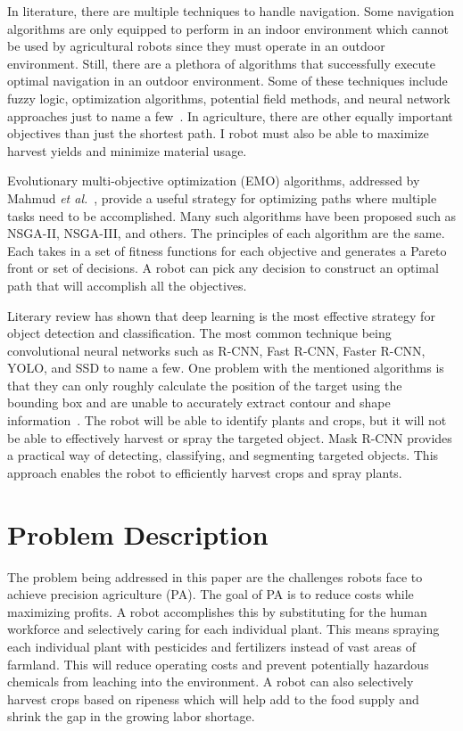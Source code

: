\documentclass[12pt]{article}
\begin{document}
In literature, there are multiple techniques to handle navigation. Some navigation algorithms are only equipped to perform in an indoor environment which cannot be used by agricultural robots since they must operate in an outdoor environment. Still, there are a plethora of algorithms that successfully execute optimal navigation in an outdoor environment. Some of these techniques include fuzzy logic, optimization algorithms, potential field methods, and neural network approaches just to name a few~\cite{mohanta2019knowledge}. In agriculture, there are other equally important objectives than just the shortest path. I robot must also be able to maximize harvest yields and minimize material usage.

Evolutionary multi-objective optimization (EMO) algorithms, addressed by Mahmud \emph{et al.}~\cite{MAHMUD2019488}, provide a useful strategy for optimizing paths where multiple tasks need to be accomplished. Many such algorithms have been proposed such as NSGA-II, NSGA-III, and others. The principles of each algorithm are the same. Each takes in a set of fitness functions for each objective and generates a Pareto front or set of decisions. A robot can pick any decision to construct an optimal path that will accomplish all the objectives.

Literary review has shown that deep learning is the most effective strategy for object detection and classification. The most common technique being convolutional neural networks such as R-CNN, Fast R-CNN, Faster R-CNN, YOLO, and SSD to name a few. One problem with the mentioned algorithms is that they can only roughly calculate the position of the target using the bounding box and are unable to accurately extract contour and shape information~\cite{yu2019fruit}. The robot will be able to identify plants and crops, but it will not be able to effectively harvest or spray the targeted object. Mask R-CNN provides a practical way of detecting, classifying, and segmenting targeted objects. This approach enables the robot to efficiently harvest crops and spray plants.

\section{Problem Description}
The problem being addressed in this paper are the challenges robots face to achieve precision agriculture (PA). The goal of PA is to reduce costs while maximizing profits. A robot accomplishes this by substituting for the human workforce and selectively caring for each individual plant. This means spraying each individual plant with pesticides and fertilizers instead of vast areas of farmland. This will reduce operating costs and prevent potentially hazardous chemicals from leaching into the environment. A robot can also selectively harvest crops based on ripeness which will help add to the food supply and shrink the gap in the growing labor shortage.
\end{document}

